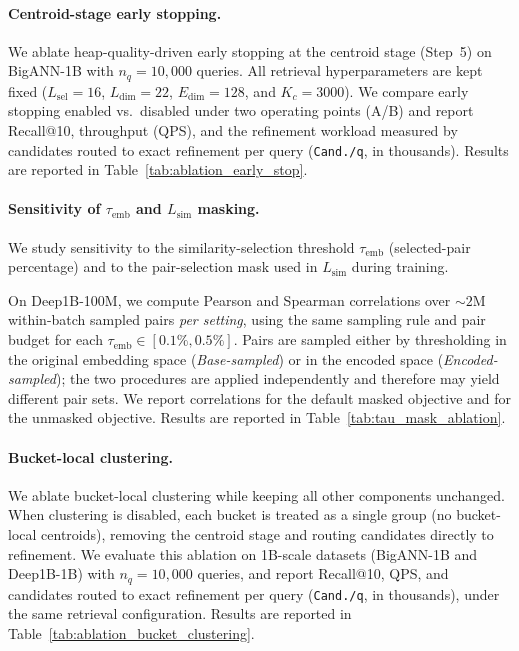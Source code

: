 \documentclass[sigconf, nonacm]{acmart}
\begin{document}
\paragraph{Centroid-stage early stopping.}
We ablate heap-quality-driven early stopping at the centroid stage (Step~5) on BigANN-1B with $n_q{=}10{,}000$ queries.
All retrieval hyperparameters are kept fixed ($L_{\text{sel}}{=}16$, $L_{\text{dim}}{=}22$, $E_{\text{dim}}{=}128$, and $K_c{=}3000$).
We compare early stopping enabled vs.\ disabled under two operating points (A/B) and report Recall@10, throughput (QPS),
and the refinement workload measured by candidates routed to exact refinement per query (\texttt{Cand./q}, in thousands).
Results are reported in Table~\ref{tab:ablation_early_stop}.

\paragraph{Sensitivity of $\tau_{\text{emb}}$ and $L_{\text{sim}}$ masking.}
We study sensitivity to the similarity-selection threshold $\tau_{\text{emb}}$ (selected-pair percentage) and to the pair-selection mask used in $L_{\text{sim}}$ during training.

On Deep1B-100M, we compute Pearson and Spearman correlations over $\sim\!2$M within-batch sampled pairs \emph{per setting},
using the same sampling rule and pair budget for each $\tau_{\text{emb}}\in[0.1\%,0.5\%]$.
Pairs are sampled either by thresholding in the original embedding space (\emph{Base-sampled}) or in the encoded space (\emph{Encoded-sampled});
the two procedures are applied independently and therefore may yield different pair sets.
We report correlations for the default masked objective and for the unmasked objective.
Results are reported in Table~\ref{tab:tau_mask_ablation}.

\paragraph{Bucket-local clustering.}
We ablate bucket-local clustering while keeping all other components unchanged.
When clustering is disabled, each bucket is treated as a single group (no bucket-local centroids), removing the centroid stage and routing candidates directly to refinement.
We evaluate this ablation on 1B-scale datasets (BigANN-1B and Deep1B-1B) with $n_q{=}10{,}000$ queries, and report Recall@10, QPS,
and candidates routed to exact refinement per query (\texttt{Cand./q}, in thousands), under the same retrieval configuration.
Results are reported in Table~\ref{tab:ablation_bucket_clustering}.
\end{document}
